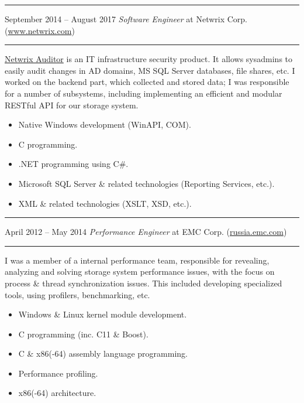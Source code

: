 \documentclass[11pt]{article}
\newcommand\CXX{C\nolinebreak[4]\hspace{-.05em}\raisebox{.4ex}{\relsize{-3}{\textbf{++}}}}
\newcommand\CvSmallSkipLength{0.5em}
\newcommand\CvSkip[1]{\vspace{#1}}
\newcommand\CvSmallSkip{\CvSkip{\CvSmallSkipLength}}
\newcommand\CvRule{\begingroup\color{CvRuleColor}\hrule\endgroup}
\newcommand\CvWorkplaceHeader[5]{\begingroup%
  \CvRule\nopagebreak%
  \fboxsep0pt%
  \colorbox{CvWorkplaceHeaderColor}{%
    \begin{minipage}{\linewidth-2\fboxsep}%
\CvSmallSkip%
#1 -- #2 \hfill \textit{#3} at #4 (\href{http://#5/}{#5})%
\CvSmallSkip%
    \end{minipage}%
  }%
  \CvRule%
\endgroup%
}
\newenvironment{CvWorkplaceDescription}{%
    \begingroup\setlength\parskip{\CvSmallSkipLength}%
  }{%
    \CvSmallSkip\endgroup%
  }
\begin{document}
\CvWorkplaceHeader{September 2014}{August 2017}{Software Engineer}{Netwrix Corp.}{www.netwrix.com}

\begin{CvWorkplaceDescription}
\href{https://www.netwrix.com/auditor.html}{Netwrix Auditor} is an IT
infrastructure security product.
It allows sysadmins to easily audit changes in AD domains, MS SQL Server
databases, file shares, etc.
I worked on the backend part, which collected and stored data; I was
responsible for a number of subsystems, including implementing an efficient and
modular RESTful API for our storage system.

\begin{itemize}[noitemsep]
  \item Native Windows development (WinAPI, COM).
  \item {\CXX} programming.
  \item .NET programming using C\#.
  \item Microsoft SQL Server \& related technologies (Reporting Services,
etc.).
  \item XML \& related technologies (XSLT, XSD, etc.).
\end{itemize}
\end{CvWorkplaceDescription}

\CvWorkplaceHeader{April 2012}{May 2014}{Performance Engineer}{EMC Corp.}{russia.emc.com}

\begin{CvWorkplaceDescription}
I was a member of a internal performance team, responsible for revealing,
analyzing and solving storage system performance issues, with the focus on
process \& thread synchronization issues.
This included developing specialized tools, using profilers, benchmarking, etc.

\begin{itemize}[noitemsep]
  \item Windows \& Linux kernel module development.
  \item {\CXX} programming (inc. {\CXX}11 \& Boost).
  \item C \& x86(-64) assembly language programming.
  \item Performance profiling.
  \item x86(-64) architecture.
\end{itemize}
\end{CvWorkplaceDescription}
\end{document}
